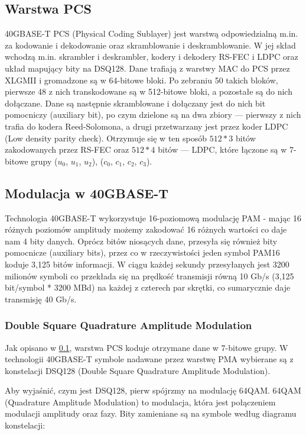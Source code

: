 \subsection{Warstwa PCS}\label{subsection:pcs}
40GBASE-T PCS (Physical Coding Sublayer) jest warstwą odpowiedzialną m.in. za kodowanie i dekodowanie oraz skramblowanie i deskramblowanie. W jej skład wchodzą m.in. skrambler i deskrambler, kodery i dekodery RS-FEC i LDPC oraz układ mapujący bity na DSQ128.
Dane trafiają z warstwy MAC do PCS przez XLGMII i gromadzone są w 64-bitowe bloki. Po zebraniu 50 takich bloków, pierwsze 48 z nich transkodowane są w 512-bitowe bloki, a pozostałe są do nich dołączane. Dane są następnie skramblowane i dołączany jest do nich bit pomocniczy (auxiliary bit), po czym dzielone są na dwa zbiory --- pierwszy z nich trafia do kodera Reed-Solomona, a drugi przetwarzany jest przez koder LDPC (Low density parity check). Otrzymuje się w ten sposób $512*3$ bitów zakodowanych przez RS-FEC oraz $512*4$ bitów --- LDPC, które łączone są w 7-bitowe grupy  ($u_0$, $u_1$, $u_2$), ($c_0$, $c_1$, $c_2$, $c_3$).

\subsection{Modulacja w 40GBASE-T}
Technologia 40GBASE-T wykorzystuje 16-poziomową modulację PAM - mając 16 różnych poziomów amplitudy możemy zakodować 16 różnych wartości co daje nam 4 bity danych.
Oprócz bitów niosących dane, przesyła się również bity pomocnicze (auxiliary bits), przez co w rzeczywistości jeden symbol PAM16 koduje 3,125 bitów informacji.
W ciągu każdej sekundy przesyłanych jest 3200 milionów symboli co przekłada się na prędkość transmisji równą 10 Gb/s (3,125 bit/symbol * 3200 MBd) na każdej z czterech par skrętki, co sumarycznie daje transmisję 40 Gb/s.

\subsubsection{Double Square Quadrature Amplitude Modulation}
Jak opisano w \ref{subsection:pcs}, warstwa PCS koduje otrzymane dane w 7-bitowe grupy. W technologii 40GBASE-T symbole nadawane przez warstwę PMA wybierane są z konstelacji DSQ128 (Double Square Quadrature Amplitude Modulation).

Aby wyjaśnić, czym jest DSQ128, pierw spójrzmy na modulację 64QAM. 64QAM (Quadrature Amplitude Modulation) to modulacja, która jest połączeniem modulacji amplitudy oraz fazy. Bity zamieniane są na symbole według diagramu konstelacji:

